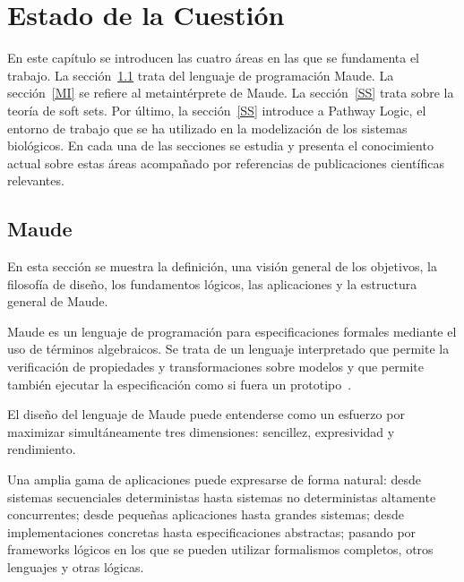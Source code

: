 
\chapter{Estado de la Cuestión}
\label{cap:estadoDeLaCuestion}

En este capítulo se introducen las cuatro áreas en las que se fundamenta el trabajo.
La sección~\ref{Maude} trata del lenguaje de programación Maude.
La sección~\ref{MI} se refiere al metaintérprete de Maude.
La sección~\ref{SS} trata sobre la teoría de soft sets.
Por último, la sección~\ref{SS} introduce a Pathway Logic, el entorno de trabajo que se ha utilizado en la modelización de los sistemas biológicos.
En cada una de las secciones se estudia y presenta el conocimiento actual sobre estas áreas acompañado por referencias de publicaciones científicas relevantes.


\section{Maude}\label{Maude}

En esta sección se muestra la definición, una visión general de los objetivos, la filosofía de diseño, los fundamentos lógicos, las aplicaciones y la estructura general de Maude.
\smallskip

Maude es un lenguaje de programación para especificaciones formales mediante el uso de términos algebraicos. Se trata de un lenguaje interpretado que permite la verificación de propiedades y transformaciones sobre modelos y que permite también ejecutar la especificación como si fuera un prototipo~\citep{maude30}.
\smallskip


El diseño del lenguaje de Maude puede entenderse como un esfuerzo por maximizar simultáneamente tres dimensiones: sencillez, expresividad y rendimiento.

Una amplia gama de aplicaciones puede expresarse de forma natural: desde sistemas secuenciales deterministas hasta sistemas no deterministas altamente concurrentes; desde pequeñas aplicaciones hasta grandes sistemas; desde implementaciones concretas hasta especificaciones abstractas; pasando por frameworks lógicos en los que se pueden utilizar formalismos completos, otros lenguajes y otras lógicas.

